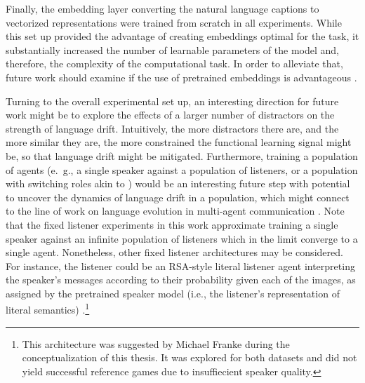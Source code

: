 Finally, the embedding layer converting the natural language captions to vectorized representations were trained from scratch in all experiments. While this set up provided the advantage of creating embeddings optimal for the task, it substantially increased the number of learnable parameters of the model and, therefore, the complexity of the computational task. In order to alleviate that, future work should examine if the use of pretrained embeddings is advantageous \parencite[following, e.~g.,][]{atliha2021pretrained}.

Turning to the overall experimental set up, an interesting direction for future work might be to explore the effects of a larger number of distractors on the strength of language drift. Intuitively, the more distractors there are, and the more similar they are, the more constrained the functional learning signal might be, so that language drift might be mitigated.  Furthermore, training a population of agents (e.~g., a single speaker against a population of listeners, or a population with switching roles akin to \cite{bouchacourt2019miss}) would be an interesting future step with potential to uncover the dynamics of language drift in a population, which might connect to the line of work on language evolution in multi-agent communication \parencite[e.~g.,][]{graesser2019emergent, chaabouni2019anti, kirby2014iterated}. Note that the fixed listener experiments in this work approximate training a single speaker against an infinite population of listeners which in the limit converge to a single agent. Nonetheless, other fixed listener architectures may be considered. For instance, the listener could be an RSA-style literal listener agent interpreting the speaker's messages according to their probability given each of the images, as assigned by the pretrained speaker model (i.e., the listener's representation of literal semantics) \parencite[cf.][]{frank2016rational}.\footnote{This architecture was suggested by Michael Franke during the conceptualization of this thesis. It was explored for both datasets and did not yield successful reference games due to insuffiecient speaker quality.} 

